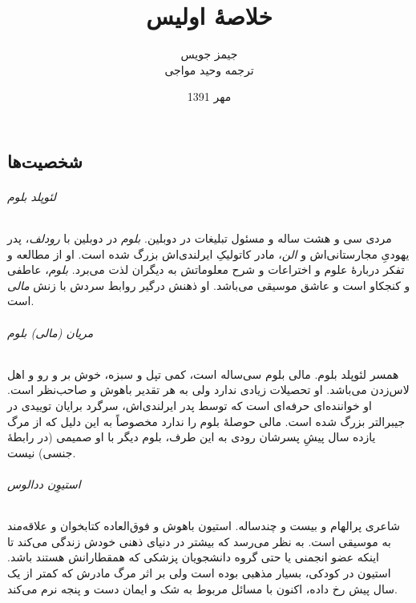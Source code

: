 \documentclass[12pt]{book}
\newcommand{\noun}[1]{\textit{\textcolor{black!70}{#1}}}
\begin{document}
    \title{خلاصۀ اولیس }
    \author{جیمز جویس\\
    ترجمه وحید مواجی
    }
    \date{مهر 1391}
    \frontmatter                            %
    \maketitle                              %
    \tableofcontents                        %
    \mainmatter


    \part{}
    \chapter{شخصیت‌ها}
    \paragraph{\noun{لئوپلد بلوم}\protect{}}
    مردی سی و هشت ساله و مسئول تبلیغات در دوبلین. \noun{بلوم} در دوبلین با \noun{رودلف}، پدر یهودیِ مجارستانی‌اش‌ و \noun{الن}، مادر کاتولیکِ ایرلندی‌اش بزرگ شده است. او از مطالعه و تفکر دربارۀ علوم و اختراعات و شرح معلوماتش به دیگران لذت می‌برد. \noun{بلوم}، عاطفی و کنجکاو است و عاشق موسیقی می‌باشد. او ذهنش درگیر روابط سردش با زنش \noun{مالی} است.
    \paragraph{\noun{مریان (مالی) بلوم}\protect{}}
    همسر لئوپلد بلوم. مالی بلوم سی‌ساله است، کمی تپل و سبزه، خوش بر و رو و اهل لاس‌زدن می‌باشد. او تحصیلات زیادی ندارد ولی به هر تقدیر باهوش و صاحب‌نظر است. او خواننده‌ای حرفه‌ای است که توسط پدر ایرلندی‌اش، سرگرد برایان توییدی در جیبرالتر بزرگ شده است. مالی حوصلۀ بلوم را ندارد مخصوصاً به این دلیل که از مرگ یازده سال پیشِ پسرشان رودی به این طرف، بلوم دیگر با او صمیمی (در رابطۀ جنسی) نیست.
    \paragraph{\noun{استیوِن ددالوس}\protect{}}
    شاعری پرالهام و بیست و چندساله. استیون باهوش و فوق‌العاده کتابخوان و علاقه‌مند به موسیقی است. به نظر می‌رسد که بیشتر در دنیای ذهنی خودش زندگی می‌کند تا اینکه عضو انجمنی یا حتی گروه دانشجویان پزشکی که همقطارانش هستند باشد. استیون در کودکی، بسیار مذهبی بوده است ولی بر اثر مرگ مادرش که کمتر از یک سال پیش رخ داده، اکنون با مسائل مربوط به شک و ایمان دست و پنجه نرم می‌کند.
\end{document}
